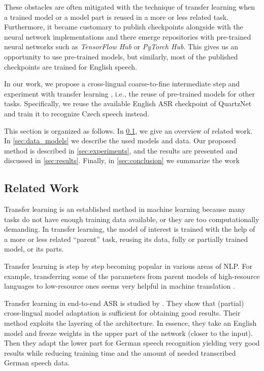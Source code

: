These obstacles are often mitigated with the technique of transfer learning  when a trained model or a model part is reused in a more or less related task.
Furthermore, it became customary to publish checkpoints alongside with the neural network implementations and 
there emerge repositories with pre-trained neural networks such as \textit{TensorFlow Hub} or \textit{PyTorch
	Hub}. This gives us an opportunity to use pre-trained models, but similarly, most of the published checkpoints are trained for English speech.

In our work, we propose a cross-lingual coarse-to-fine intermediate step and experiment with transfer learning , i.e., the reuse of pre-trained models for other tasks. Specifically,
we reuse the available English ASR checkpoint of QuartzNet  and train it to recognize Czech speech instead.

This section is organized as follows. In \cref{asr:related_work}, we give an overview of related work. In \cref{sec:data_models} we describe the used models and data. Our proposed method is described in \cref{sec:experiments}, and the results are presented and discussed in \cref{sec:results}.
Finally, in \cref{sec:conclusion} we summarize the work%


\subsection{Related Work}
\label{asr:related_work}

Transfer learning  is an established method in machine learning because many tasks do not have enough training data available, or they are too computationally demanding. In transfer learning, the model of interest is trained with the help of a more or less related ``parent'' task, reusing its data, fully or partially trained model, or its parts.

Transfer learning is step by step becoming popular in various areas of NLP. 
For example, transferring some of the parameters from parent models of high-resource languages to low-resource ones seems very helpful in machine translation .

Transfer learning in end-to-end ASR is studied by  . They show that (partial) cross-lingual model adaptation is sufficient for obtaining good results. Their method exploits the layering of the architecture. In essence, they take an English model and freeze weights in the upper part of the network (closer to the input). Then they adapt the lower part for German speech recognition yielding very good results while reducing training time and the amount of needed transcribed German speech data.

